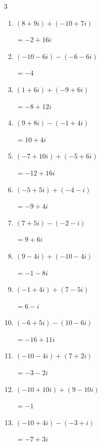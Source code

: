 \begin{multicols}{3}
\begin{enumerate}
        $\displaystyle =-8+6i$

  \item $\displaystyle (8+9i) + (-10+7i)$

        $\displaystyle =-2+16i$

  \item $\displaystyle (-10-6i) - (-6-6i)$

        $\displaystyle =-4$

  \item $\displaystyle (1+6i) + (-9+6i)$

        $\displaystyle =-8+12i$

\columnbreak %

  \item $\displaystyle (9+8i) - (-1+4i)$

        $\displaystyle =10+4i$

  \item $\displaystyle (-7+10i) + (-5+6i)$

        $\displaystyle =-12+16i$

  \item $\displaystyle (-5+5i) + (-4-i)$

        $\displaystyle =-9+4i$

  \item $\displaystyle (7+5i) - (-2-i)$

        $\displaystyle =9+6i$

  \item $\displaystyle (9-4i) + (-10-4i)$

        $\displaystyle =-1-8i$

  \item $\displaystyle (-1+4i) + (7-5i)$

        $\displaystyle =6-i$

  \item $\displaystyle (-6+5i) - (10-6i)$

        $\displaystyle =-16+11i$

  \item $\displaystyle (-10-4i) + (7+2i)$

        $\displaystyle =-3-2i$

  \item $\displaystyle (-10+10i) + (9-10i)$

        $\displaystyle =-1$

  \item $\displaystyle (-10+4i) - (-3+i)$

        $\displaystyle =-7+3i$


\end{enumerate}
\end{multicols}
